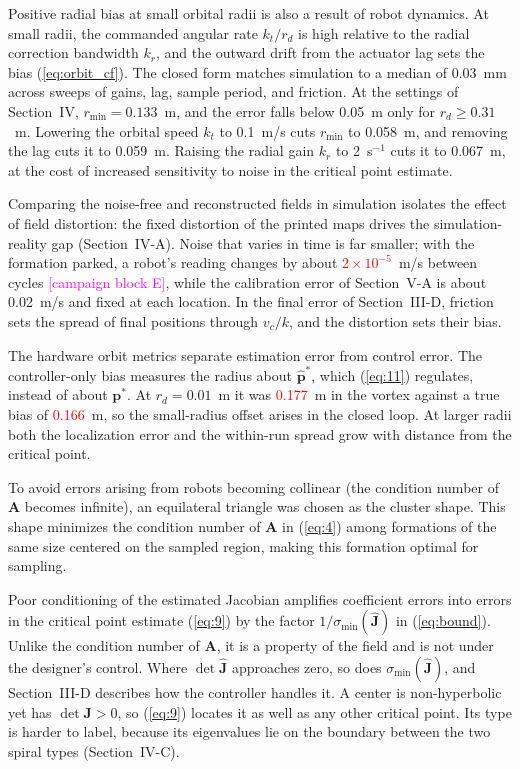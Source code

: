 \documentclass[lettersize,journal]{IEEEtran}
\newcommand{\syn}[1]{\textcolor{red}{#1}}
\newcommand{\rev}[1]{#1}
\newcommand{\open}[1]{\textcolor{magenta}{[#1]}}
\begin{document}
Positive radial bias at small orbital radii is also a result of robot dynamics. At small radii, the commanded angular rate $k_t / r_d$ is high relative to the radial correction bandwidth $k_r$, and the outward drift from the actuator lag sets the bias (\ref{eq:orbit_cf}). The closed form matches simulation to a median of \rev{0.03}~mm across sweeps of gains, lag, sample period, and friction. At the settings of Section~IV, $r_{\min} = \rev{0.133}$~m, and the error falls below 0.05~m only for $r_d \ge \rev{0.31}$~m. Lowering the orbital speed $k_t$ to 0.1~m/s cuts $r_{\min}$ to \rev{0.058}~m, and removing the lag cuts it to \rev{0.059}~m. Raising the radial gain $k_r$ to 2~s$^{-1}$ cuts it to \rev{0.067}~m, at the cost of increased sensitivity to noise in the critical point estimate.

Comparing the noise-free and reconstructed fields in simulation isolates the effect of field distortion: the fixed distortion of the printed maps drives the simulation-reality gap (Section~IV-A). Noise that varies in time is far smaller; with the formation parked, a robot's reading changes by about \syn{$2\times10^{-5}$}~m/s between cycles \open{campaign block E}, while the calibration error of Section~V-A is about 0.02~m/s and fixed at each location. In the final error of Section~III-D, friction sets the spread of final positions through $v_c/k$, and the distortion sets their bias.

The hardware orbit metrics separate estimation error from control error. The controller-only bias measures the radius about $\hat{\mathbf{p}}^*$, which (\ref{eq:11}) regulates, instead of about $\mathbf{p}^*$. At $r_d = 0.01$~m it was \syn{0.177}~m in the vortex against a true bias of \syn{0.166}~m, so the small-radius offset arises in the closed loop. At larger radii both the localization error and the within-run spread grow with distance from the critical point.

To avoid errors arising from robots becoming collinear (the condition number of $\mathbf{A}$ becomes infinite), an equilateral triangle was chosen as the cluster shape. This shape minimizes the condition number of $\mathbf{A}$ in (\ref{eq:4}) among formations of the same size centered on the sampled region, making this formation optimal for sampling.

Poor conditioning of the estimated Jacobian amplifies coefficient errors into errors in the critical point estimate (\ref{eq:9}) by the factor $1/\sigma_{\min}(\hat{\mathbf{J}})$ in (\ref{eq:bound}). Unlike the condition number of $\mathbf{A}$, it is a property of the field and is not under the designer's control. Where $\det\hat{\mathbf{J}}$ approaches zero, so does $\sigma_{\min}(\hat{\mathbf{J}})$, and Section~III-D describes how the controller handles it. A center is non-hyperbolic yet has $\det\mathbf{J} > 0$, so (\ref{eq:9}) locates it as well as any other critical point. Its type is harder to label, because its eigenvalues lie on the boundary between the two spiral types (Section~IV-C).
\end{document}
